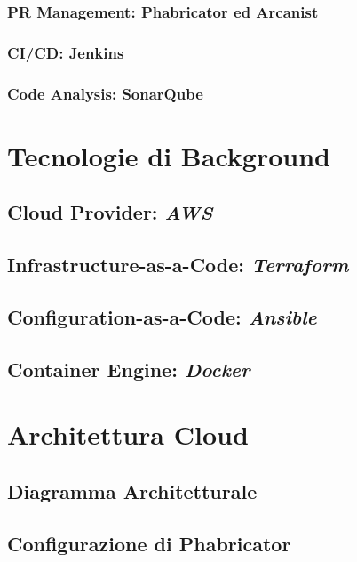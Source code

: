 \documentclass[a4paper,12pt]{report}
\begin{document}
	\subsection{PR Management: Phabricator ed Arcanist}
	
	\subsection{CI/CD: Jenkins}
	
	\subsection{Code Analysis: SonarQube}
	
	\chapter{Tecnologie di Background}
	
	\section{Cloud Provider: \emph{AWS}}
	
	\section{Infrastructure-as-a-Code: \emph{Terraform}}
	
	\section{Configuration-as-a-Code: \emph{Ansible}}
	
	\section{Container Engine: \emph{Docker}}
	
	\chapter{Architettura Cloud}
	
	\section{Diagramma Architetturale}
	
	\section{Configurazione di Phabricator}
	
\end{document}
